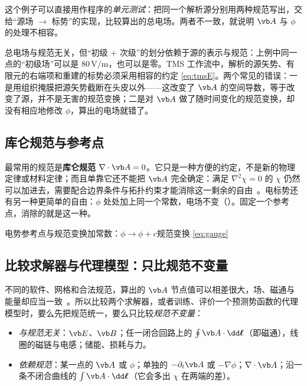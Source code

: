 这个例子可以直接用作程序的\emph{单元测试}：把同一个解析源分别用两种规范写出，交给“源场 $\to$ 标势”的实现，比较算出的总电场。两者不一致，就说明 $\vb A$ 与 $\phi$ 的处理不相容。

\begin{pitfall}
总电场与规范无关，但“初级 + 次级”的划分依赖于源的表示与规范：上例中同一点的“初级场”可以是 $80\,\mathrm{V/m}$，也可以是零。TMS 工作流中，解析的源矢势、有限元的右端项和重建的标势必须采用相容的约定 \eqref{eq:tmsE}。两个常见的错误：一是用组织掩膜把源矢势截断在头皮以外——这改变了 $\vb A$ 的空间导数，等于改变了源，并不是无害的规范变换；二是对 $\vb A$ 做了随时间变化的规范变换，却没有相应地修改 $\phi$，算出的电场就错了。
\end{pitfall}

\subsection{库仑规范与参考点}
最常用的规范是\textbf{库仑规范} $\nabla\cdot\vb A=0$。它只是一种方便的约定，不是新的物理定律或材料定律；而且单靠它还不能把 $\vb A$ 完全确定：满足 $\nabla^2\chi=0$ 的 $\chi$ 仍然可以加进去，需要配合边界条件与拓扑约束才能消除这一剩余的自由~\cite{vectorpoisson}。电标势还有另一种更简单的自由：$\phi$ 处处加上同一个常数，电场不变（）。固定一个参考点，消除的就是这一种。

\begin{compare}{电势参考点与规范变换}{加常数：$\phi\to\phi+c$}{规范变换 \eqref{eq:gauge}}
\end{compare}

\subsection{比较求解器与代理模型：只比规范不变量}
不同的软件、网格和合法规范，算出的 $\vb A$ 节点值可以相差很大，场、磁通与能量却应当一致~\cite{vectorpoisson}。所以比较两个求解器，或者训练、评价一个预测势函数的代理模型时，要么先把规范统一，要么只比较\emph{规范不变量}：
\begin{itemize}
\item \emph{与规范无关}：$\vb E$、$\vb B$；任一闭合回路上的 $\oint\vb A\cdot\dd\boldsymbol\ell$（即磁通），线圈的磁链与电感；储能、损耗与力。
\item \emph{依赖规范}：某一点的 $\vb A$ 或 $\phi$；单独的 $-\partial_t\vb A$ 或 $-\nabla\phi$；$\nabla\cdot\vb A$；沿一条不闭合曲线的 $\int\vb A\cdot\dd\boldsymbol\ell$（它会多出 $\chi$ 在两端的差）。
\end{itemize}


